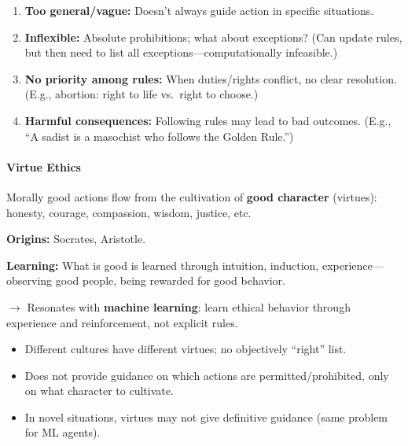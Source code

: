 \begin{tipbox}
\begin{enumerate}
  \item \textbf{Too general/vague:} Doesn't always guide action in specific situations.
  \item \textbf{Inflexible:} Absolute prohibitions; what about exceptions? (Can update rules, but then need to list all exceptions---computationally infeasible.)
  \item \textbf{No priority among rules:} When duties/rights conflict, no clear resolution. (E.g., abortion: right to life vs.\ right to choose.)
  \item \textbf{Harmful consequences:} Following rules may lead to bad outcomes. (E.g., ``A sadist is a masochist who follows the Golden Rule.'')
\end{enumerate}
\end{tipbox}

\separator

\paragraph*{Virtue Ethics}

\begin{defbox}
Morally good actions flow from the cultivation of \textbf{good character} (virtues): honesty, courage, compassion, wisdom, justice, etc.

\textbf{Origins:} Socrates, Aristotle.

\textbf{Learning:} What is good is learned through intuition, induction, experience---observing good people, being rewarded for good behavior.

$\to$ Resonates with \textbf{machine learning}: learn ethical behavior through experience and reinforcement, not explicit rules.
\end{defbox}

\begin{tipbox}
\begin{itemize}
  \item Different cultures have different virtues; no objectively ``right'' list.
  \item Does not provide guidance on which actions are permitted/prohibited, only on what character to cultivate.
  \item In novel situations, virtues may not give definitive guidance (same problem for ML agents).
\end{itemize}
\end{tipbox}

